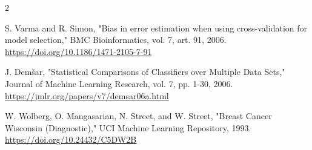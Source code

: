 \documentclass[10pt,a4paper]{article}
\begin{document}
\begin{multicols}{2}
\begin{minipage}{\linewidth}{\fontsize{7}{8.2}\selectfont [13] S. Varma and R. Simon, "Bias in error estimation when using cross-validation for model selection," BMC Bioinformatics, vol. 7, art. 91, 2006. \url{https://doi.org/10.1186/1471-2105-7-91}\par}\end{minipage}\par
\begin{minipage}{\linewidth}{\fontsize{7}{8.2}\selectfont [14] J. Demšar, "Statistical Comparisons of Classifiers over Multiple Data Sets," Journal of Machine Learning Research, vol. 7, pp. 1-30, 2006. \url{https://jmlr.org/papers/v7/demsar06a.html}\par}\end{minipage}\par
\begin{minipage}{\linewidth}{\fontsize{7}{8.2}\selectfont [15] W. Wolberg, O. Mangasarian, N. Street, and W. Street, "Breast Cancer Wisconsin (Diagnostic)," UCI Machine Learning Repository, 1993. \url{https://doi.org/10.24432/C5DW2B}\par}\end{minipage}\par
\end{multicols}
\end{document}
